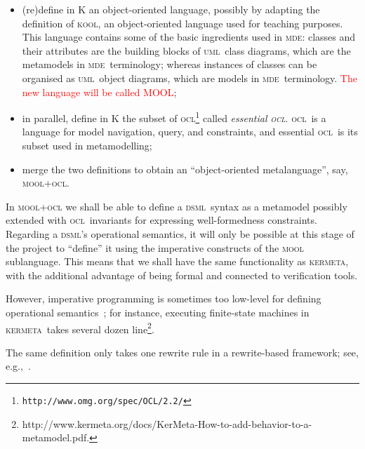 \documentclass[a4paper,11pt,twoside]{article}
\newcommand{\dsml}{\textsc{dsml}}
\newcommand{\mde}{\textsc{mde}}
\newcommand{\kmt}{\textsc{kermeta}}
\newcommand{\uml}{\textsc{uml}}
\newcommand{\ocl}{\textsc{ocl}}
\begin{document}
\begin{itemize}
\item (re)define in K an object-oriented language, possibly by adapting the definition of  \textsc{kool}, an object-oriented language used for teaching purposes\cite{hills-rosu-2007-rta}. This language contains some of the basic ingredients used in \mde: classes and their attributes are the building blocks of \uml\ class diagrams,
which are the metamodels in \mde\ terminology; whereas
instances of classes can be organised as \uml\ object diagrams, which are models in \mde\ terminology. \textcolor{red}{The new language will be called MOOL};
\item in parallel, define in K the subset of  \ocl\footnote{\tt http://www.omg.org/spec/OCL/2.2/} called \emph{essential \ocl}. \ocl\ is a language for model navigation, 
 query, and constraints, and essential \ocl\  is its  subset used in metamodelling;
\item merge  the two definitions to obtain an ``object-oriented metalanguage'', say, \textsc{mool+ocl}.
\end{itemize}

In \textsc{mool+ocl}  we shall be able to define a \dsml\ syntax as a metamodel possibly extended with \ocl\ invariants for expressing well-formedness constraints. Regarding a  \dsml's operational semantics, it will only  be possible
at this stage of the project to ``define'' it using the imperative constructs of the \textsc{mool} sublanguage. This means that we shall have the same functionality as \kmt, with the additional advantage of being formal and connected to verification tools.


 However,  imperative programming is sometimes too low-level for defining operational semantics~; for instance, executing
finite-state machines in \kmt\ takes several dozen line\footnote{http://www.kermeta.org/docs/KerMeta-How-to-add-behavior-to-a-metamodel.pdf.}.

The same definition only takes one  rewrite  rule in a rewrite-based framework; see, e.g.,~\cite{r10b}. 
\end{document}
